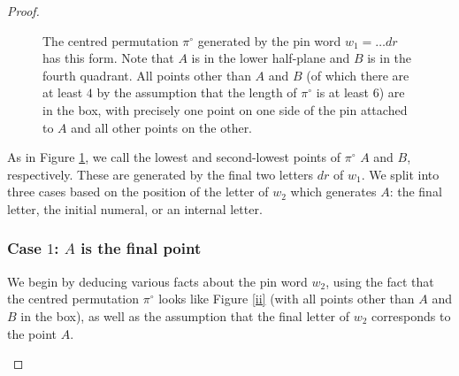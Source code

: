 \documentclass[11pt,a4paper]{article}
\newcommand{\plotptradius}{4pt}
\theoremstyle{definition}
\begin{document}
\begin{proof}
\begin{figure}[h]
\begin{center}
\end{center}
\caption{The centred permutation $\pi^{\circ}$ generated by the pin word $w_{1}=\dots dr$ has this form. Note that $A$ is in the lower half-plane and $B$ is in the fourth quadrant. All points other than $A$ and $B$ (of which there are at least $4$ by the assumption that the length of $\pi^{\circ}$ is at least $6$) are in the box, with precisely one point on one side of the pin attached to $A$ and all other points on the other.}
\label{i}
\end{figure}

As in Figure \ref{i}, we call the lowest and second-lowest points of $\pi^{\circ}$ $A$ and $B$, respectively. These are generated by the final two letters $dr$ of $w_{1}$. We split into three cases based on the position of the letter of $w_{2}$ which generates $A$: the final letter, the initial numeral, or an internal letter.

\subsubsection*{Case $1$: $A$ is the final point}

We begin by deducing various facts about the pin word $w_{2}$, using the fact that the centred permutation $\pi^{\circ}$ looks like Figure \ref{ii} (with all points other than $A$ and $B$ in the box), as well as the assumption that the final letter of $w_{2}$ corresponds to the point $A$.

\begin{figure}[h]
\begin{center}
\end{center}
\end{figure}
\end{proof}
\end{document}
